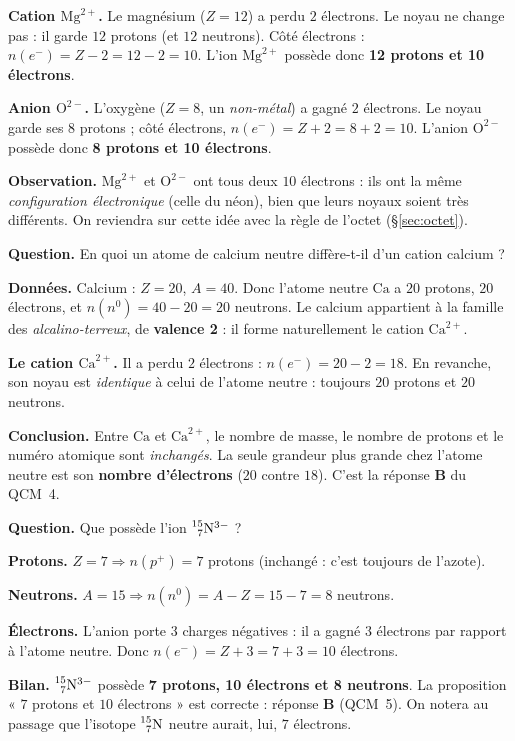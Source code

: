 \documentclass[11pt,a4paper]{article}
\newcommand{\nuc}[3]{\prescript{#1}{#2}{\mathrm{#3}}}  %
\newcommand{\pp}{p^{+}}      %
\newcommand{\ee}{e^{-}}      %
\newcommand{\nz}{n^{0}}      %
\newcommand{\np}{n(\pp)}     %
\renewcommand{\ne}{n(\ee)}   %
\newcommand{\nnn}{n(\nz)}    %
\begin{document}
\begin{exemple}
\textbf{Cation $\mathrm{Mg}^{2+}$.} Le magnésium ($Z = 12$) a perdu $2$ électrons. Le noyau ne change
pas : il garde $12$ protons (et $12$ neutrons). Côté électrons : $\ne = Z - 2 = 12 - 2 = 10$. L'ion
$\mathrm{Mg}^{2+}$ possède donc \textbf{12 protons et 10 électrons}.

\smallskip
\textbf{Anion $\mathrm{O}^{2-}$.} L'oxygène ($Z = 8$, un \emph{non-métal}) a gagné $2$ électrons.
Le noyau garde ses $8$ protons ; côté électrons, $\ne = Z + 2 = 8 + 2 = 10$. L'anion $\mathrm{O}^{2-}$
possède donc \textbf{8 protons et 10 électrons}.

\smallskip
\textbf{Observation.} $\mathrm{Mg}^{2+}$ et $\mathrm{O}^{2-}$ ont tous deux $10$ électrons : ils ont la
même \emph{configuration électronique} (celle du néon), bien que leurs noyaux soient très différents.
On reviendra sur cette idée avec la règle de l'octet (§\ref{sec:octet}).
\end{exemple}

\begin{exemple}
\textbf{Question.} En quoi un atome de calcium neutre diffère-t-il d'un cation calcium ?

\smallskip
\textbf{Données.} Calcium : $Z = 20$, $A = 40$. Donc l'atome neutre $\mathrm{Ca}$ a $20$ protons,
$20$ électrons, et $\nnn = 40 - 20 = 20$ neutrons. Le calcium appartient à la famille des
\emph{alcalino-terreux}, de \textbf{valence 2} : il forme naturellement le cation $\mathrm{Ca}^{2+}$.

\smallskip
\textbf{Le cation $\mathrm{Ca}^{2+}$.} Il a perdu $2$ électrons : $\ne = 20 - 2 = 18$. En revanche, son
noyau est \emph{identique} à celui de l'atome neutre : toujours $20$ protons et $20$ neutrons.

\smallskip
\textbf{Conclusion.} Entre $\mathrm{Ca}$ et $\mathrm{Ca}^{2+}$, le nombre de masse, le nombre de
protons et le numéro atomique sont \emph{inchangés}. La seule grandeur plus grande chez l'atome neutre
est son \textbf{nombre d'électrons} ($20$ contre $18$). C'est la réponse \textbf{B} du QCM~4.
\end{exemple}

\begin{exemple}[composition de l'anion $\nuc{15}{7}{N}^{3-}$]
\textbf{Question.} Que possède l'ion $\nuc{15}{7}{N}^{3-}$ ?

\smallskip
\textbf{Protons.} $Z = 7 \Rightarrow \np = 7$ protons (inchangé : c'est toujours de l'azote).

\textbf{Neutrons.} $A = 15 \Rightarrow \nnn = A - Z = 15 - 7 = 8$ neutrons.

\textbf{Électrons.} L'anion porte $3$ charges négatives : il a gagné $3$ électrons par rapport à
l'atome neutre. Donc $\ne = Z + 3 = 7 + 3 = 10$ électrons.

\smallskip
\textbf{Bilan.} $\nuc{15}{7}{N}^{3-}$ possède \textbf{7 protons, 10 électrons et 8 neutrons}. La
proposition « $7$ protons et $10$ électrons » est correcte : réponse \textbf{B} (QCM~5). On notera
au passage que l'isotope $\nuc{15}{7}{N}$ neutre aurait, lui, $7$ électrons.
\end{exemple}
\end{document}
